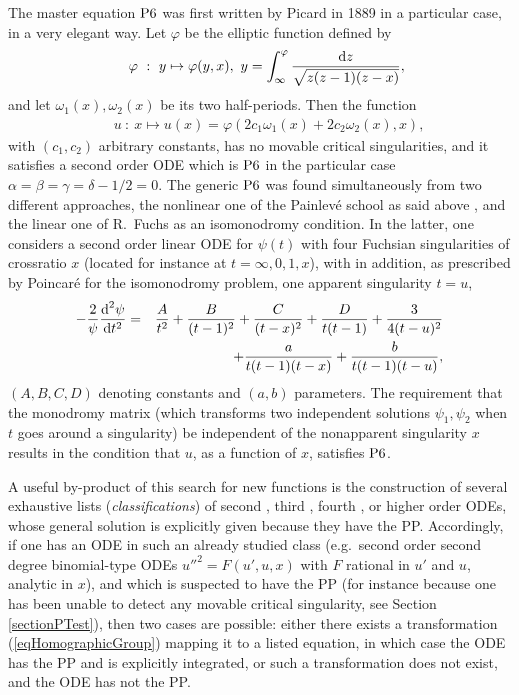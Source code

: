 \documentclass[10pt]{article}
\begin{document}
The master equation ${\rm P6}$ was first written 
by Picard in 1889 in a particular case, in a very elegant way.
Let $\varphi$ be the elliptic function defined by
\begin{eqnarray}
& &
\varphi\ :\ y \mapsto \varphi(y,x),\
y=\int_{\infty}^{\varphi} \frac{\hbox{d} z}{\sqrt{z(z-1)(z-x)}},
\end{eqnarray}
and let $\omega_1(x),\omega_2(x)$ be its two half-periods.
Then the function
\begin{eqnarray}
& &
u\ :\ x \mapsto u(x)=\varphi(2 c_1 \omega_1(x) + 2 c_2 \omega_2(x),x),\
\end{eqnarray}
with $(c_1,c_2)$ arbitrary constants,
has no movable critical singularities,
and it satisfies a second order ODE which is
${\rm P6}$ in the particular case $\alpha=\beta=\gamma=\delta-1/2=0$.
The generic ${\rm P6}$ was found simultaneously from two different approaches,
the nonlinear one of the Painlev\'e school as said above \cite{PaiCRAS1906},
and the linear one of R.~Fuchs \cite{FuchsP6} as an isomonodromy condition.
In the latter, one considers a second order linear ODE for $\psi(t)$
with four Fuchsian singularities of crossratio $x$
(located for instance at $t=\infty,0,1,x$),
with in addition, as prescribed by Poincar\'e for the isomonodromy problem,
one apparent singularity $t=u$,
\begin{eqnarray}
- \frac{2}{\psi} \frac{\hbox{d}^2 \psi}{\hbox{d} t^2}
& = &
  \frac{A}{t^2}
+ \frac{B}{(t-1)^2}
+ \frac{C}{(t-x)^2}
+ \frac{D}{t (t-1)}
+ \frac{3     }{4 (t-u)^2}
\nonumber
\\
& &
+ \frac{a     }{t (t-1) (t-x)}
+ \frac{b     }{t (t-1) (t-u)},
\end{eqnarray}
$(A,B,C,D)$ denoting constants and $(a,b)$ parameters.
The requirement that the monodromy matrix
(which transforms two independent solutions $\psi_1,\psi_2$
when $t$ goes around a singularity)
be independent of the nonapparent singularity $x$
results in the condition that $u$, as a function of $x$,
satisfies ${\rm P6}$.

A useful by-product of this search for new functions is the
construction of several exhaustive lists (\textit{classifications})
 \index{classification}
of
second \cite{GambierThese,BureauMIII,CosODE2,CosScou,Cos1997},
third  \cite{ChazyThese,BureauMII,Cos2000b},
fourth \cite{BureauMII,Cos2000a},
or higher order \cite{ExtonRM} ODEs,
whose general solution is explicitly given because they have the PP.
Accordingly,
if one has an ODE in such an already studied class
(e.g.~second order second degree binomial-type ODEs \cite{CosScou}
$u''^2=F(u',u,x)$ with $F$ rational in $u'$ and $u$, analytic in $x$),
and which is suspected to have the PP
(for instance because one has been unable to detect any movable critical
singularity, see Section \ref{sectionPTest}),
then two cases are possible:
either there exists a transformation (\ref{eqHomographicGroup})
mapping it to a listed equation,
in which case the ODE has the PP and is explicitly integrated,
or such a transformation does not exist,
and the ODE has not the PP.
\end{document}
